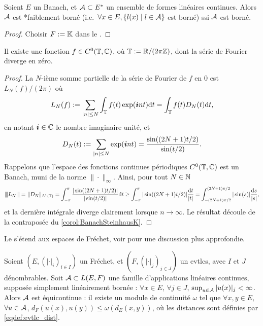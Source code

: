 \begin{corollary}
\label{corol:BanachSteinhausK}
%
	Soient $E$ un Banach, et $\mathcal{A} \subset E^*$ un ensemble de formes linéaires continues. Alors $\mathcal{A}$
	est *faiblement borné
	(i.e.\ $\forall x \in E, \{l(x)\mid l \in \mathcal{A}\}$ est borné) ssi $\mathcal{A}$ est borné. 
\end{corollary}

\begin{proof}
Choisir $F := \mathbb{K}$ dans le .
\end{proof}

\begin{exemple}
\label{ex:FourierDiverge}
	Il existe une fonction $f\in C^0(\mathbb{T}, \mathbb{C})$, où $\mathbb{T} := \mathbb{R}/(2 \pi \mathbb{Z})$, dont la série de Fourier diverge en zéro. 
\end{exemple}

\begin{proof}
	La $N$-ième somme partielle de la série de Fourier de $f$ en $0$ est $L_N(f)/(2\pi)$ où %
	\begin{equation*}
		L_N(f) 
		:= \sum_{|n| \leq N} \int_{\mathbb{T}} f(t) \exp(\boldsymbol{i} n t) \mathrm{d} t
		= \int_{\mathbb{T}} f(t) D_N(t) \mathrm{d} t, 
	\end{equation*}
	en notant $\boldsymbol{i} \in \mathbb{C}$ le nombre imaginaire unité, et 
	\begin{equation*}
		D_N(t) := \sum_{|n| \leq N} \exp(\boldsymbol{i} n t) = \frac{\sin((2N+1) t/2)}{\sin (t/2)}.
	\end{equation*}
	Rappelons que l'espace des fonctions continues périodiques $C^0(\mathbb{T},\mathbb{C})$ est un Banach, muni de la norme $\|\cdot\|_\infty$. Ainsi, pour tout $N \in \mathbb{N}$
	\begin{equation*}
		{\left\vert\kern-0.25ex\left\vert\kern-0.25ex\left\vert L_N \right\vert\kern-0.25ex\right\vert\kern-0.25ex\right\vert} = \|D_N\|_{L^1(\mathbb{T})} = \int_{-\pi}^{\pi} \frac{|\sin((2N+1)t/2)|}{|\sin(t/2)|} \mathrm{d} t
		\geq \int_{-\pi}^{\pi} |\sin((2N+1)t/2)| \frac{\mathrm{d} t} {|t|}
		= \int_{-(2N+1)\pi/2}^{(2N+1)\pi/2} |\sin(s)| \frac{\mathrm{d} s} {|s|},
	\end{equation*}
	et la dernière intégrale diverge clairement lorsque $n \to \infty$. 
	Le résultat découle de la contraposée du \cref{corol:BanachSteinhausK}. 
\end{proof}


Le  s'étend aux espaces de Fréchet, voir \cite[Theorem 1.33]{alazard2017analyse} pour une discussion plus approfondie.

\begin{theorem}
\label{th:BanachSteinhausFrechet}
	Soient $(E,(|\cdot|_i)_{i \in I})$ un Fréchet, et $(F,(|\cdot|_j)_{j \in J})$ un evtlcs, avec $I$ et $J$ dénombrables. Soit $\mathcal{A}\subset L(E,F)$ une famille d'applications linéaires continues, supposée simplement linéairement bornée : $\forall x\in E$, $\forall j \in J$, $\sup_{u \in \mathcal{A}} |u(x)|_j < \infty$. Alors $\mathcal{A}$ est équicontinue : il existe un module de continuité $\omega$ tel que $\forall x,y \in E$, $\forall u \in \mathcal{A}$, $d_F(u(x),u(y)) \leq \omega(d_E(x,y))$, où les distances sont définies par \eqref{eqdef:evtlc_dist}.
\end{theorem}

